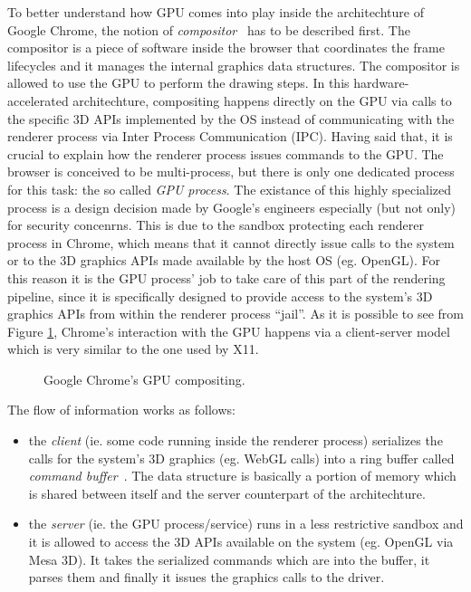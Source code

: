 To better understand how GPU comes into play inside the architechture of Google
Chrome, the notion of \emph{compositor}~\cite{gpucompositing} has to be described first.
The compositor is a piece of software inside the browser that coordinates the frame
lifecycles and it manages the internal graphics data structures. The compositor
is allowed to use the GPU to perform the drawing steps. In this hardware-accelerated
architechture, compositing happens directly on the GPU via calls to the specific 3D
APIs implemented by the OS instead of communicating with the renderer process via
Inter Process Communication (IPC).
Having said that, it is crucial to explain how the renderer process issues
commands to the GPU. The browser is conceived to be multi-process, but
there is only one dedicated process for this task: the so called \emph{GPU process}.
The existance of this highly specialized process is a design decision made by Google's
engineers especially (but not only) for security concenrns. This is due to the
sandbox protecting each renderer process in Chrome, which means that it cannot
directly issue calls to the system or to the 3D graphics APIs
made available by the host OS (eg. OpenGL). For this reason it is the GPU process' job
to take care of this part of the rendering pipeline, since it is specifically
designed to provide access to the system's 3D graphics APIs from within the renderer
process ``jail''.
As it is possible to see from Figure \ref{img:chrome_gpu_compositing}, Chrome's
interaction with the GPU happens via a client-server model which is very similar
to the one used by X11.
\begin{figure}[!htb]
    \caption{Google Chrome's GPU compositing.}
    \label{img:chrome_gpu_compositing}
\end{figure}

The flow of information works as follows:
\begin{itemize}
    \item the \emph{client} (ie. some code running inside the renderer process) serializes
        the calls for the system's 3D graphics (eg. WebGL calls) into a ring buffer called
        \emph{command buffer}~\cite{gpucommandbffer}. The data structure is basically a
        portion of memory which is shared between itself and the server counterpart of
        the architechture.
    \item the \emph{server} (ie. the GPU process/service) runs in a less restrictive sandbox
        and it is allowed to access the 3D APIs available on the system (eg. OpenGL via Mesa 3D).
        It takes the serialized commands which are into the buffer, it parses them and finally
        it issues the graphics calls to the driver.
\end{itemize}

